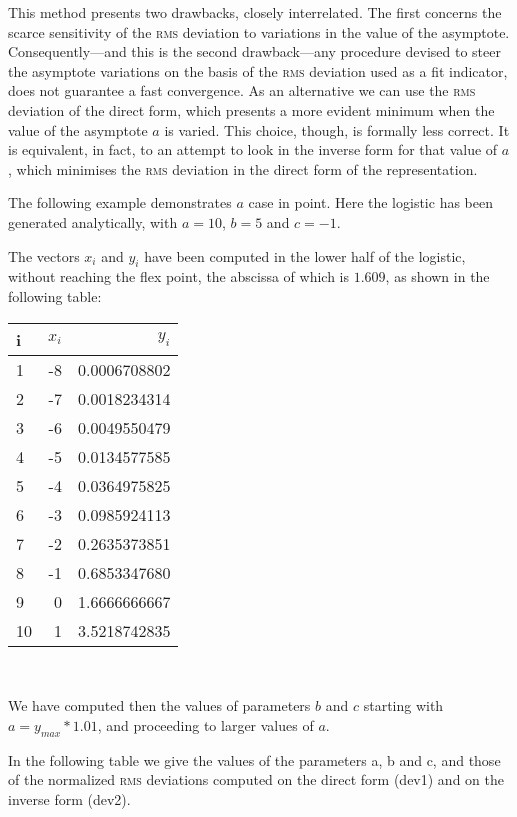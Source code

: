 \documentclass[%
 aip,
 jmp,%
 amsmath,amssymb,
 reprint,%
]{revtex4-1}
\begin{document}
This method  presents two  drawbacks, closely interrelated. The first concerns the scarce sensitivity of the \textsc{rms} deviation  to  variations  in the value  of the  asymptote.  Consequently---and this is the second drawback---any procedure devised to steer the asymptote variations on the basis of the \textsc{rms} deviation used as a fit indicator, does  not guarantee a fast convergence.
As an alternative we can use the \textsc{rms} deviation of the direct form, which presents a more evident minimum when the value of  the asymptote $a$ is varied. This choice, though, is formally less correct. It is equivalent, in fact, to  an attempt to look in the inverse form for that value of $a$, which minimises the \textsc{rms} deviation in the direct form  of  the representation.

The following example demonstrates $a$ case in point. Here the logistic has been generated analytically, with $a = 10$, $b = 5$  and  $c = -1$.

The vectors $x_i$ and $y_i$ have been computed in the lower half of the logistic, without reaching the flex point, the abscissa of which is $1.609$, as shown in the following table:\\

{\centering
\begin{tabular}{lrr}

 i & $x_i$ & $y_i$ \\ \hline
 1 & -8 & 0.0006708802 \\
 2 & -7 & 0.0018234314 \\
 3 & -6 & 0.0049550479 \\
 4 & -5	& 0.0134577585 \\
 5 & -4 & 0.0364975825 \\
 6 & -3 & 0.0985924113 \\
 7 & -2 & 0.2635373851 \\
 8 & -1 & 0.6853347680 \\
 9 &  0 & 1.6666666667 \\
 10 & 1 & 3.5218742835
\end{tabular}\\[4mm]}

We have computed then the values of parameters $b$ and $c$ starting with $a = y_{max} * 1.01$, and proceeding to larger values of $a$.

In the following table we give the values of the parameters  a, b and c, and those of the normalized \textsc{rms} deviations computed on the direct  form (dev1) and on the inverse form (dev2).
\end{document}
